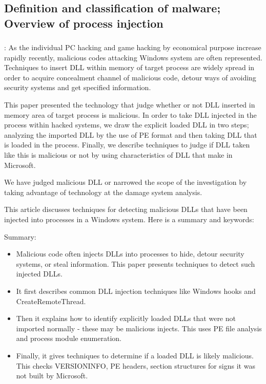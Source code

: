 \documentclass{article}
\begin{document}
\subsection{Definition and classification of malware; Overview of process injection}

\subsubsection{\textcite{Jang:2007}}
\textbf{}: As the individual PC hacking and game hacking by economical purpose increase rapidly recently, malicious codes attacking Windows system are often represented. Techniques to insert DLL within memory of target process are widely spread in order to acquire concealment channel of malicious code, detour ways of avoiding security systems and get specified information.

This paper presented the technology that judge whether or not DLL inserted in memory area of target process is malicious. In order to take DLL injected in the process within hacked systems, we draw the explicit loaded DLL in two steps; analyzing the imported DLL by the use of PE format and then taking DLL that is loaded in the process. Finally, we describe techniques to judge if DLL taken like this is malicious or not by using characteristics of DLL that make in Microsoft.

We have judged malicious DLL or narrowed the scope of the investigation by taking advantage of technology at the damage system analysis.

This article discusses techniques for detecting malicious DLLs that have been injected into processes in a Windows system. Here is a summary and keywords:

Summary:

\begin{itemize}
\item Malicious code often injects DLLs into processes to hide, detour security systems, or steal information. This paper presents techniques to detect such injected DLLs.
\item It first describes common DLL injection techniques like Windows hooks and CreateRemoteThread.
\item Then it explains how to identify explicitly loaded DLLs that were not imported normally - these may be malicious injects. This uses PE file analysis and process module enumeration.
\item Finally, it gives techniques to determine if a loaded DLL is likely malicious. This checks VERSIONINFO, PE headers, section structures for signs it was not built by Microsoft.
\end{itemize}
\end{document}
